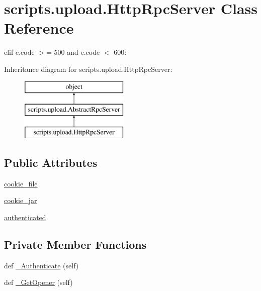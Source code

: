 \hypertarget{classscripts_1_1upload_1_1_http_rpc_server}{}\section{scripts.\+upload.\+Http\+Rpc\+Server Class Reference}
\label{classscripts_1_1upload_1_1_http_rpc_server}


elif e.\+code $>$= 500 and e.\+code $<$ 600\+:  


Inheritance diagram for scripts.\+upload.\+Http\+Rpc\+Server\+:\begin{figure}[H]
\begin{center}
\leavevmode
\includegraphics[height=3.000000cm]{d7/d1f/classscripts_1_1upload_1_1_http_rpc_server}
\end{center}
\end{figure}
\subsection*{Public Attributes}
\begin{DoxyCompactItemize}
\item 
\mbox{\hyperlink{classscripts_1_1upload_1_1_http_rpc_server_a0ee6fe5f647f2518d8c9a26732b9aed7}{cookie\+\_\+file}}
\item 
\mbox{\hyperlink{classscripts_1_1upload_1_1_http_rpc_server_a9f588f07168174b11c82388d58c40137}{cookie\+\_\+jar}}
\item 
\mbox{\hyperlink{classscripts_1_1upload_1_1_http_rpc_server_afe678f980411f300ced8509b319e0df4}{authenticated}}
\end{DoxyCompactItemize}
\subsection*{Private Member Functions}
\begin{DoxyCompactItemize}
\item 
def \mbox{\hyperlink{classscripts_1_1upload_1_1_http_rpc_server_a61268eda38c588475463218af8a050e0}{\+\_\+\+Authenticate}} (self)
\item 
def \mbox{\hyperlink{classscripts_1_1upload_1_1_http_rpc_server_a44de63ab67503b0d11fd37c1c3a22124}{\+\_\+\+Get\+Opener}} (self)
\end{DoxyCompactItemize}
